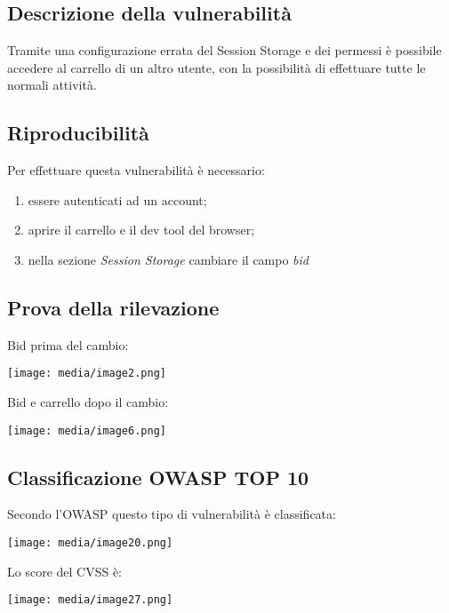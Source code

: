 \subsection{Descrizione della
vulnerabilità}\label{descrizione-della-vulnerabilituxe0-2}

Tramite una configurazione errata del Session Storage e dei permessi è
possibile accedere al carrello di un altro utente, con la possibilità di
effettuare tutte le normali attività.

\subsection{Riproducibilità}\label{riproducibilituxe0-2}

Per effettuare questa vulnerabilità è necessario:

\begin{enumerate}
\def\labelenumi{\arabic{enumi}.}
\item
  essere autenticati ad un account;
\item
  aprire il carrello e il dev tool del browser;
\item
  nella sezione \emph{Session Storage} cambiare il campo \emph{bid}
\end{enumerate}

\subsection{Prova della rilevazione}\label{prova-della-rilevazione-2}

Bid prima del cambio:

\texttt{[image: media/image2.png]}

Bid e carrello dopo il cambio:

\texttt{[image: media/image6.png]}

\subsection{Classificazione OWASP TOP
10}\label{classificazione-owasp-top-10-2}

Secondo l'OWASP questo tipo di vulnerabilità è classificata:

\texttt{[image: media/image20.png]}

Lo score del CVSS è:

\texttt{[image: media/image27.png]}

